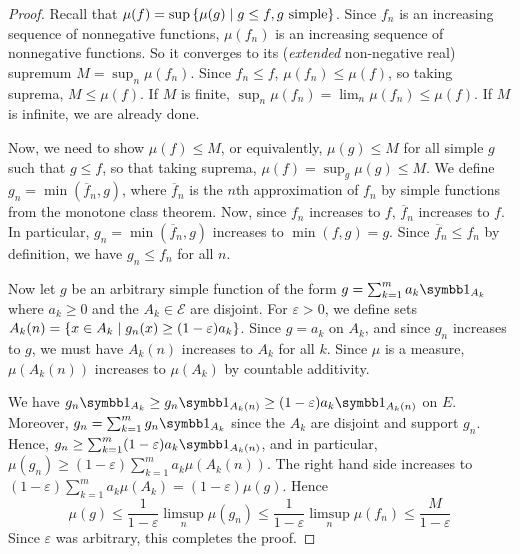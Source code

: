 \begin{proof}
	Recall that \( \mu(f) = \sup\qty{\mu(g) \mid g \leq f, g \text{ simple}} \).
	Since \( f_n \) is an increasing sequence of nonnegative functions, \( \mu(f_n) \) is an increasing sequence of nonnegative functions.
	So it converges to its (\emph{extended} non-negative real) supremum \( M = \sup_n \mu(f_n) \).
	Since \( f_n \leq f \), \( \mu(f_n) \leq \mu(f) \), so taking suprema, \( M \leq \mu(f) \).
	If \( M \) is finite, \( \sup_n \mu(f_n) = \lim_n \mu(f_n) \leq \mu(f) \).
	If \( M \) is infinite, we are already done.

	Now, we need to show \( \mu(f) \leq M \), or equivalently, \( \mu(g) \leq M \) for all simple \( g \) such that \( g \leq f \), so that taking suprema, \( \mu(f) = \sup_g \mu(g) \leq M \).
	We define \( g_n = \min (\overline f_n, g) \), where \( \overline f_n \) is the \( n \)th approximation of \( f_n \) by simple functions from the monotone class theorem.
	Now, since \( f_n \) increases to \( f \), \( \overline f_n \) increases to \( f \).
	In particular, \( g_n = \min(\overline f_n, g) \) increases to \( \min(f, g) = g \).
	Since \( \overline f_n \leq f_n \) by definition, we have \( g_n \leq f_n \) for all \( n \).

	Now let \( g \) be an arbitrary simple function of the form \( g = \sum_{k=1}^m a_k \symbb 1_{A_k} \) where \( a_k \geq 0 \) and the \( A_k \in \mathcal E \) are disjoint.
	For \( \varepsilon > 0 \), we define sets \( A_k(n) = \qty{x \in A_k \mid g_n(x) \geq (1-\varepsilon) a_k} \).
	Since \( g = a_k \) on \( A_k \), and since \( g_n \) increases to \( g \), we must have \( A_k(n) \) increases to \( A_k \) for all \( k \).
	Since \( \mu \) is a measure, \( \mu(A_k(n)) \) increases to \( \mu(A_k) \) by countable additivity.

	We have \( g_n \symbb 1_{A_k} \geq g_n \symbb 1_{A_k(n)} \geq (1-\varepsilon)a_k \symbb 1_{A_k(n)} \) on \( E \).
	Moreover, \( g_n = \sum_{k=1}^m g_n \symbb 1_{A_k} \) since the \( A_k \) are disjoint and support \( g_n \).
	Hence, \( g_n \geq \sum_{k=1}^m (1-\varepsilon)a_k \symbb 1_{A_k(n)} \), and in particular, \( \mu(g_n) \geq (1 - \varepsilon) \sum_{k=1}^m a_k \mu(A_k(n)) \).
	The right hand side increases to \( (1-\varepsilon) \sum_{k=1}^m a_k \mu(A_k) = (1-\varepsilon) \mu(g) \).
	Hence
	\[ \mu(g) \leq \frac{1}{1-\varepsilon} \limsup_n \mu(g_n) \leq \frac{1}{1-\varepsilon} \limsup_n \mu(f_n) \leq \frac{M}{1-\varepsilon} \]
	Since \( \varepsilon \) was arbitrary, this completes the proof.
\end{proof}

